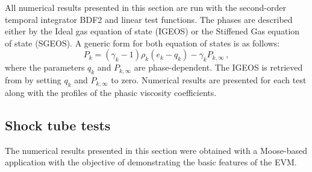 \documentclass[preprint,10pt]{elsarticle}
\begin{document}
All numerical results presented in this section are run with the second-order 
temporal integrator BDF2 \cite{bdf2} and linear test functions. The phases are described either by the Ideal gas equation of state (IGEOS) or the Stiffened Gas equation 
of state (SGEOS). A generic form for both equation of states is as follows:
%
\begin{equation}\label{eq:generic-form}
P_k = (\gamma_k-1) \rho_k (e_k - q_k) - \gamma_k P_{k,\infty} \, ,
\end{equation}
%
where the parameters $q_k$ and $P_{k,\infty}$ are phase-dependent. The IGEOS is retrieved from  by setting $q_k$ and $P_{k,\infty}$ to 
zero. Numerical results are presented for each test along with the profiles of the phasic viscosity coefficients.
%
\subsection{Shock tube tests}\label{sec:1d-results-sba}
%
The numerical results presented in this section were obtained with a Moose-based application with the objective of demonstrating the basic features of the EVM.
%
\end{document}
